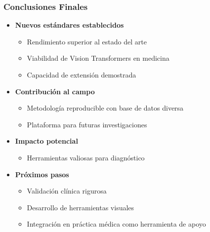 \begin{frame}
\frametitle{Conclusiones Finales}
\begin{itemize}
    \item \textbf{Nuevos estándares establecidos}
    \begin{itemize}
        \item Rendimiento superior al estado del arte
        \item Viabilidad de Vision Transformers en medicina
        \item Capacidad de extensión demostrada
    \end{itemize}
    \item \textbf{Contribución al campo}
    \begin{itemize}
        \item Metodología reproducible con base de datos diversa
        \item Plataforma para futuras investigaciones
    \end{itemize}
    \item \textbf{Impacto potencial}
    \begin{itemize}
        \item Herramientas valiosas para diagnóstico
    \end{itemize}
    \item \textbf{Próximos pasos}
    \begin{itemize}
        \item Validación clínica rigurosa
        \item Desarrollo de herramientas visuales
        \item Integración en práctica médica como herramienta de apoyo
    \end{itemize}
\end{itemize}
\end{frame}
